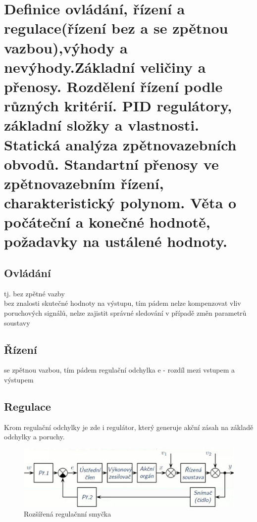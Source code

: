 \section{Definice ovládání, řízení a regulace(řízení bez a se zpětnou vazbou),výhody a nevýhody.Základní veličiny a přenosy. Rozdělení řízení podle různých kritérií. PID regulátory, základní složky a vlastnosti. Statická analýza zpětnovazebních obvodů. Standartní přenosy ve zpětnovazebním řízení, charakteristický polynom. Věta o počáteční a konečné hodnotě, požadavky na ustálené hodnoty.}
\subsection*{Ovládání}
tj. bez zpětné vazby\\
bez znalosti skutečné hodnoty na výstupu, tím pádem nelze kompenzovat vliv poruchových signálů, nelze zajistit správné sledování v případě změn parametrů soustavy\\
\subsection*{Řízení}
se zpětnou vazbou, tím pádem regulační odchylka e - rozdíl mezi vstupem a výstupem
\subsection*{Regulace}
Krom regulační odchylky je zde i regulátor, který generuje akční zásah na základě odchylky a poruchy.
\begin{figure}[H]
    \includegraphics[scale = 0.45]{images/reg.soustava.png}
    \caption{Rozšířená regulačnní smyčka}
\end{figure}
